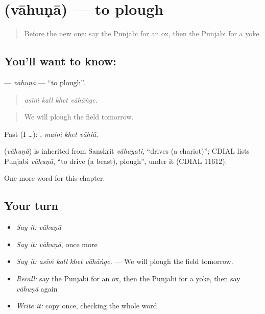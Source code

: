 \section[\texorpdfstring{\pa{ਵਾਹੁਣਾ} (vāhuṇā)}{ਵਾਹੁਣਾ (vāhuṇā)}]{ (vāhuṇā) — to plough}

\label{lesson:PA-C301-vahuna}



\begin{quote}
Before the new one: say the Punjabi for an ox, then the Punjabi for a yoke.
\end{quote}

\subsection*{You'll want to know: }
\textbf{} — \emph{vāhuṇā} — \textquotedblleft{}to plough\textquotedblright{}.

\begin{quote}
   
\end{quote}

\begin{quote}
\emph{asīṁ kall khet vāhāṅge.}
\end{quote}

\begin{quote}
We will plough the field tomorrow.
\end{quote}

Past (I …):   , \emph{maiṁ khet vāhiā}.

\begin{cousinweb}
\textbf{} (\emph{vāhuṇā}) is inherited from Sanskrit \emph{vāhayati}, \textquotedblleft{}drives (a chariot)\textquotedblright{}; CDIAL lists Punjabi \emph{vāhuṇā}, \textquotedblleft{}to drive (a beast), plough\textquotedblright{}, under it (CDIAL 11612).
\end{cousinweb}

\begin{grammarlens}[title={What you've built}]
One more word for this chapter.
\end{grammarlens}

\subsection*{Your turn}
\begin{itemize}
\raggedright
  \item \emph{Say it:} \emph{vāhuṇā}
  \item \emph{Say it:} \emph{vāhuṇā}, once more
  \item \emph{Say it:} \emph{asīṁ kall khet vāhāṅge.} — We will plough the field tomorrow.
  \item \emph{Recall:} say the Punjabi for an ox, then the Punjabi for a yoke, then say \emph{vāhuṇā} again
  \item \emph{Write it:} copy \textbf{} once, checking the whole word
\end{itemize}

